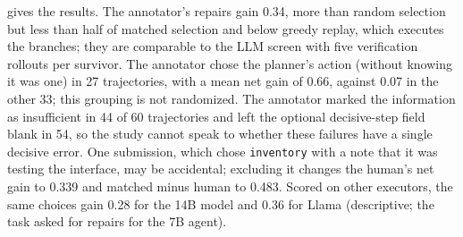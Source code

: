 \documentclass{article}
\theoremstyle{plain}
\theoremstyle{definition}
\theoremstyle{remark}
\begin{document}
\begin{table}[!htbp]
  \caption{A human reader on the 60 unscreened 7B ALFWorld failures: net gain for the 7B agent, scored on all ten of its rollouts per branch (paired trajectory bootstrap, 10,000 replicates, 90\% intervals). Rollouts: deployed-agent rollouts per trajectory used for selection.}
  \label{tab:human}
  \centering
  \footnotesize
  \setlength{\tabcolsep}{3pt}
\end{table}

 gives the results. The annotator's repairs gain 0.34, more than random selection but less than half of matched selection and below greedy replay, which executes the branches; they are comparable to the LLM screen with five verification rollouts per survivor. The annotator chose the planner's action (without knowing it was one) in 27 trajectories, with a mean net gain of 0.66, against 0.07 in the other 33; this grouping is not randomized. The annotator marked the information as insufficient in 44 of 60 trajectories and left the optional decisive-step field blank in 54, so the study cannot speak to whether these failures have a single decisive error. One submission, which chose \texttt{inventory} with a note that it was testing the interface, may be accidental; excluding it changes the human's net gain to 0.339 and matched minus human to 0.483. Scored on other executors, the same choices gain 0.28 for the 14B model and 0.36 for Llama (descriptive; the task asked for repairs for the 7B agent).
\end{document}
